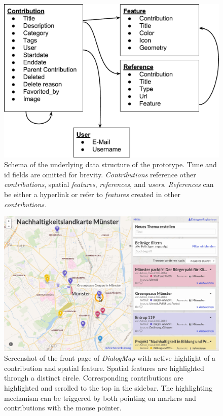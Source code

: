 \begin{figure}[h]
    \centering
    \includegraphics[width=1\columnwidth]{images/data_structure}
    \caption{Schema of the underlying data structure of the prototype. Time and id fields are omitted for brevity. \textit{Contributions} reference other \textit{contributions}, spatial \textit{features}, \textit{references}, and \textit{users}. \textit{References} can be either a hyperlink or refer to \textit{features} created in other \textit{contributions}.}
    \label{fig:data_structure}
\end{figure}

\begin{figure}[h]
    \centering
    \includegraphics[width=1\columnwidth]{images/screenshot}
    \caption{Screenshot of the front page of \textit{DialogMap} with active highlight of a contribution and spatial feature. Spatial features are highlighted through a distinct circle. Corresponding contributions are highlighted and scrolled to the top in the sidebar. The highlighting mechanism can be triggered by both pointing on markers and contributions with the mouse pointer.}
    \label{fig:screenshot}
\end{figure}

